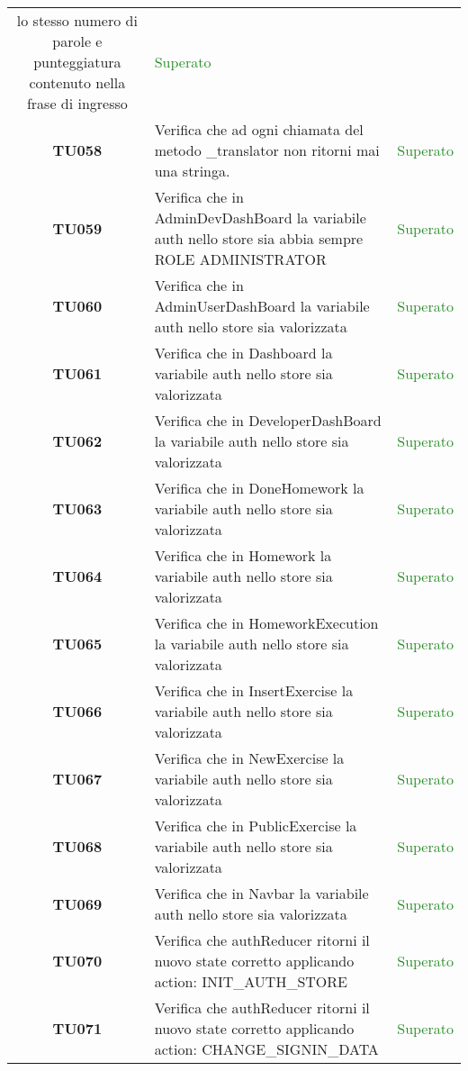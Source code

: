 \begin{tabularx}{\textwidth}{cXc}
	lo stesso numero di parole e punteggiatura contenuto nella frase di ingresso  & \textcolor{ForestGreen}{Superato} \\
	\textbf{TU058} & Verifica che ad ogni chiamata del metodo \_translator non ritorni mai una stringa. & \textcolor{ForestGreen}{Superato} \\
	\textbf{TU059} & Verifica che in AdminDevDashBoard la variabile auth nello store sia abbia sempre ROLE ADMINISTRATOR & \textcolor{ForestGreen}{Superato} \\
	\textbf{TU060} & Verifica che in AdminUserDashBoard la variabile auth nello store sia valorizzata & \textcolor{ForestGreen}{Superato} \\
	\textbf{TU061} & Verifica che in Dashboard la variabile auth nello store sia valorizzata & \textcolor{ForestGreen}{Superato} \\
	\textbf{TU062} & Verifica che in DeveloperDashBoard la variabile auth nello store sia valorizzata & \textcolor{ForestGreen}{Superato} \\
	\textbf{TU063} & Verifica che in DoneHomework la variabile auth nello store sia valorizzata & \textcolor{ForestGreen}{Superato} \\
	\textbf{TU064} & Verifica che in Homework la variabile auth nello store sia valorizzata & \textcolor{ForestGreen}{Superato} \\
	\textbf{TU065} & Verifica che in HomeworkExecution la variabile auth nello store sia valorizzata & \textcolor{ForestGreen}{Superato} \\
	\textbf{TU066} & Verifica che in InsertExercise la variabile auth nello store sia valorizzata & \textcolor{ForestGreen}{Superato} \\
	\textbf{TU067} & Verifica che in NewExercise la variabile auth nello store sia valorizzata & \textcolor{ForestGreen}{Superato} \\
	\textbf{TU068} & Verifica che in PublicExercise la variabile auth nello store sia valorizzata & \textcolor{ForestGreen}{Superato} \\
	\textbf{TU069} & Verifica che in Navbar la variabile auth nello store sia valorizzata & \textcolor{ForestGreen}{Superato} \\
	\textbf{TU070} & Verifica che authReducer ritorni il nuovo state corretto applicando action: INIT\_AUTH\_STORE & \textcolor{ForestGreen}{Superato} \\
	\textbf{TU071} & Verifica che authReducer ritorni il nuovo state corretto applicando action: CHANGE\_SIGNIN\_DATA & \textcolor{ForestGreen}{Superato} \\

\end{tabularx}
